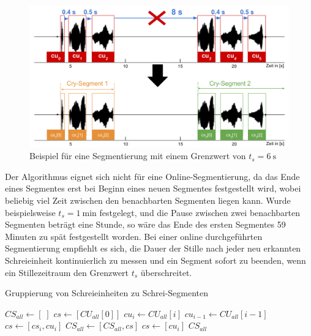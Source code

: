 \begin{figure}[h]
	\centering
	\includegraphics[width=1\textwidth]{bilder/segmentierung08.png}
	\caption[Beispiel für eine Segmentierung]{Beispiel für eine Segmentierung mit einem Grenzwert von $t_s = \SI{6}{\second}$}
	\label{img:segmenting06}
\end{figure}

Der Algorithmus eignet sich nicht für eine Online-Segmentierung, da das Ende eines Segmentes erst bei Beginn eines neuen Segmentes festgestellt wird, wobei beliebig viel Zeit zwischen den benachbarten Segmenten liegen kann. Wurde beispielsweise $t_{s} = \SI{1}{\minute}$ festgelegt, und die Pause zwischen zwei benachbarten Segmenten beträgt eine Stunde, so wäre das Ende des ersten Segmentes 59 Minuten zu spät festgestellt worden. Bei einer online durchgeführten Segmentierung empfiehlt es sich, die Dauer der Stille nach jeder neu erkannten Schreieinheit kontinuierlich zu messen und ein Segment sofort zu beenden, wenn ein Stillezeitraum den Grenzwert $t_s$ überschreitet.

\begin{algorithm}[h]
	\caption{Gruppierung von Schreieinheiten zu Schrei-Segmenten}
	\label{alg:crySegment}
	\begin{algorithmic}[1]
		\State $ CS_{all} \gets [\;]$
		\State $ cs \gets [CU_{all}[0]]$
						\State $ cu_i \gets CU_{all}[i]$
						\State $cu_{i-1} \gets CU_{all}[i-1]$
								\State $cs \gets [cs_i , cu_i]$
						\Else
								\State $CS_{all} \gets [CS_{all}, cs]$
								\State $cs \gets [cu_i]$
						\EndIf
				\EndFor
		\Return $CS_{all}$
		
		\EndFunction
		
	\end{algorithmic}
\end{algorithm}


